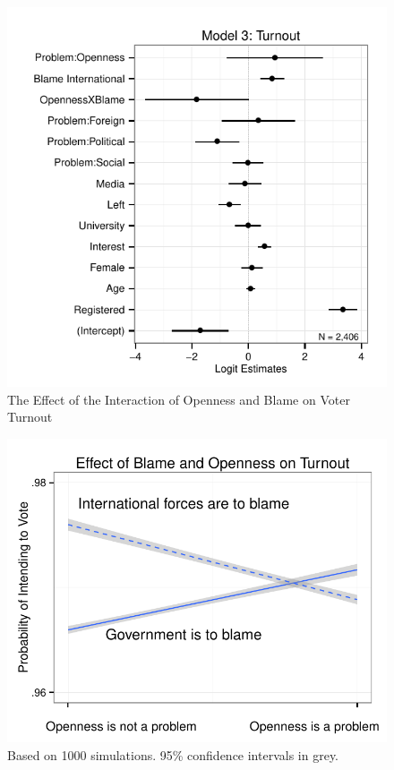 \documentclass[12pt]{report}
\begin{document}
\begin{center}
\begin{figure}
\includegraphics{article1_turnout_coefs}
\caption{The Effect of the Interaction of Openness and Blame on Voter Turnout}
\end{figure}
\end{center}

\begin{center}
\begin{figure}
\includegraphics{article1_turnout}
\caption{Based on 1000 simulations. 95\% confidence intervals in grey.}
\end{figure}
\end{center}
\end{document}
